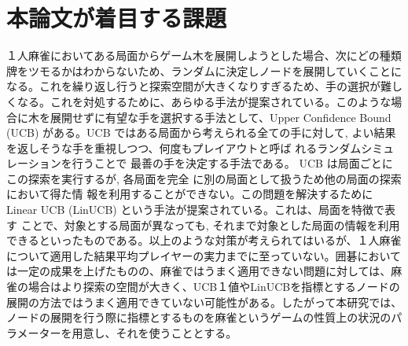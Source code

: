 \section{本論文が着目する課題}
１人麻雀においてある局面からゲーム木を展開しようとした場合、次にどの種類牌をツモるかはわからないため、ランダムに決定しノードを展開していくことになる。これを繰り返し行うと探索空間が大きくなりすぎるため、手の選択が難しくなる。これを対処するために、あらゆる手法が提案されている。このような場合に木を展開せずに有望な手を選択する手法として、Upper Confidence Bound (UCB) \cite{UCB}がある。UCB ではある局面から考えられる全ての手に対して, よい結果 を返しそうな手を重視しつつ、何度もプレイアウトと呼ば れるランダムシミュレーションを行うことで 最善の手を決定する手法である。
UCB は局面ごとにこの探索を実行するが, 各局面を完全 に別の局面として扱うため他の局面の探索において得た情 報を利用することができない。この問題を解決するためにLinear UCB (LinUCB) \cite{LinUCB} という手法が提案されている。これは、局面を特徴で表す ことで、対象とする局面が異なっても, それまで対象とした局面の情報を利用できるといったものである。以上のような対策が考えられてはいるが、１人麻雀について適用した結果平均プレイヤーの実力までに至っていない。囲碁においては一定の成果を上げたものの、麻雀ではうまく適用できない問題に対しては、麻雀の場合はより探索の空間が大きく、UCB１値やLinUCBを指標とするノードの展開の方法ではうまく適用できていない可能性がある。したがって本研究では、ノードの展開を行う際に指標とするものを麻雀というゲームの性質上の状況のパラメーターを用意し、それを使うこととする。

